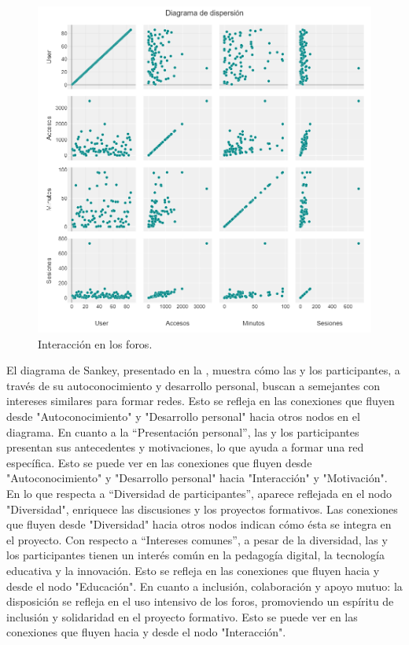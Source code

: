 \begin{figure}[htbp]
\centering
\begin{minipage}{\textwidth}
\caption{Interacción en los foros.}
\label{fig-08}
\includegraphics[width=\textwidth]{Imagem8.png}
\end{minipage}
\end{figure}

El diagrama de Sankey, presentado en la , muestra cómo las y los
participantes, a través de su autoconocimiento y desarrollo personal,
buscan a semejantes con intereses similares para formar redes. Esto se
refleja en las conexiones que fluyen desde "Autoconocimiento" y
"Desarrollo personal" hacia otros nodos en el diagrama. En cuanto a la
``Presentación personal'', las y los participantes presentan sus
antecedentes y motivaciones, lo que ayuda a formar una red específica.
Esto se puede ver en las conexiones que fluyen desde "Autoconocimiento"
y "Desarrollo personal" hacia "Interacción" y "Motivación". En lo que
respecta a ``Diversidad de participantes'', aparece reflejada en el nodo
"Diversidad", enriquece las discusiones y los proyectos formativos. Las
conexiones que fluyen desde "Diversidad" hacia otros nodos indican cómo
ésta se integra en el proyecto. Con respecto a ``Intereses comunes'', a
pesar de la diversidad, las y los participantes tienen un interés común
en la pedagogía digital, la tecnología educativa y la innovación. Esto
se refleja en las conexiones que fluyen hacia y desde el nodo
"Educación". En cuanto a inclusión, colaboración y apoyo mutuo: la
disposición se refleja en el uso intensivo de los foros, promoviendo un
espíritu de inclusión y solidaridad en el proyecto formativo. Esto se
puede ver en las conexiones que fluyen hacia y desde el nodo
"Interacción".

